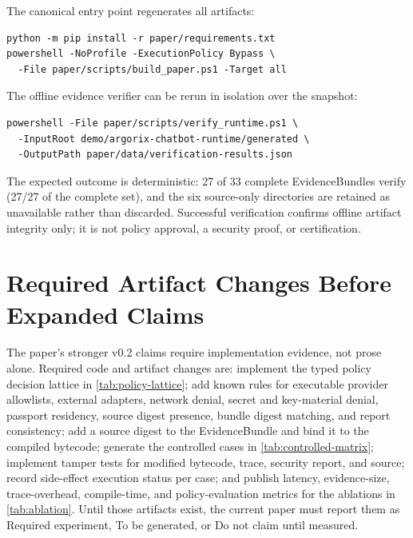 The canonical entry point regenerates all artifacts:

\begin{lstlisting}
python -m pip install -r paper/requirements.txt
powershell -NoProfile -ExecutionPolicy Bypass \
  -File paper/scripts/build_paper.ps1 -Target all
\end{lstlisting}

The offline evidence verifier can be rerun in isolation over the snapshot:

\begin{lstlisting}
powershell -File paper/scripts/verify_runtime.ps1 \
  -InputRoot demo/argorix-chatbot-runtime/generated \
  -OutputPath paper/data/verification-results.json
\end{lstlisting}

The expected outcome is deterministic: 27 of 33 complete EvidenceBundles verify
(27/27 of the complete set), and the six source-only directories are retained as
unavailable rather than discarded. Successful verification confirms offline
artifact integrity only; it is not policy approval, a security proof, or
certification.

\section*{Required Artifact Changes Before Expanded Claims}\label{sec:required-changes}
The paper's stronger v0.2 claims require implementation evidence, not prose
alone.  Required code and artifact changes are: implement the typed policy
decision lattice in \cref{tab:policy-lattice}; add known rules for executable
provider allowlists, external adapters, network denial, secret and key-material
denial, passport residency, source digest presence, bundle digest matching, and
report consistency; add a source digest to the EvidenceBundle and bind it to the
compiled bytecode; generate the controlled cases in
\cref{tab:controlled-matrix}; implement tamper tests for modified bytecode,
trace, security report, and source; record side-effect execution status per
case; and publish latency, evidence-size, trace-overhead, compile-time, and
policy-evaluation metrics for the ablations in \cref{tab:ablation}.  Until
those artifacts exist, the current paper must report them as Required
experiment, To be generated, or Do not claim until measured.

